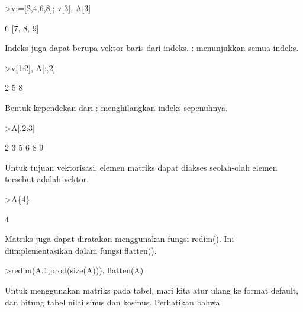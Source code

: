 \documentclass[a4paper,10pt]{article}
\begin{document}
\begin{eulernotebook}
\begin{eulercomment}
\begin{eulercomment}
\begin{eulercomment}
\begin{eulercomment}
\begin{eulercomment}
\begin{eulercomment}
\begin{eulercomment}
\begin{eulercomment}
\begin{eulercomment}
\end{eulercomment}
\begin{eulerprompt}
>v:=[2,4,6,8]; v[3], A[3]
\end{eulerprompt}
\begin{euleroutput}
  6
  [7,  8,  9]
\end{euleroutput}
\begin{eulercomment}
Indeks juga dapat berupa vektor baris dari indeks. : menunjukkan semua
indeks.
\end{eulercomment}
\begin{eulerprompt}
>v[1:2], A[:,2]
\end{eulerprompt}
\begin{euleroutput}
  [2,  4]
              2 
              5 
              8 
\end{euleroutput}
\begin{eulercomment}
Bentuk kependekan dari : menghilangkan indeks sepenuhnya.
\end{eulercomment}
\begin{eulerprompt}
>A[,2:3]
\end{eulerprompt}
\begin{euleroutput}
              2             3 
              5             6 
              8             9 
\end{euleroutput}
\begin{eulercomment}
Untuk tujuan vektorisasi, elemen matriks dapat diakses seolah-olah
elemen tersebut adalah vektor.
\end{eulercomment}
\begin{eulerprompt}
>A\{4\}
\end{eulerprompt}
\begin{euleroutput}
  4
\end{euleroutput}
\begin{eulercomment}
Matriks juga dapat diratakan menggunakan fungsi redim(). Ini
diimplementasikan dalam fungsi flatten().
\end{eulercomment}
\begin{eulerprompt}
>redim(A,1,prod(size(A))), flatten(A)
\end{eulerprompt}
\begin{euleroutput}
  [1,  2,  3,  4,  5,  6,  7,  8,  9]
  [1,  2,  3,  4,  5,  6,  7,  8,  9]
\end{euleroutput}
\begin{eulercomment}
Untuk menggunakan matriks pada tabel, mari kita atur ulang ke format
default, dan hitung tabel nilai sinus dan kosinus. Perhatikan bahwa

\end{eulercomment}
\end{eulercomment}
\end{eulercomment}
\end{eulercomment}
\end{eulercomment}
\end{eulercomment}
\end{eulercomment}
\end{eulercomment}
\end{eulercomment}
\end{eulernotebook}
\end{document}
